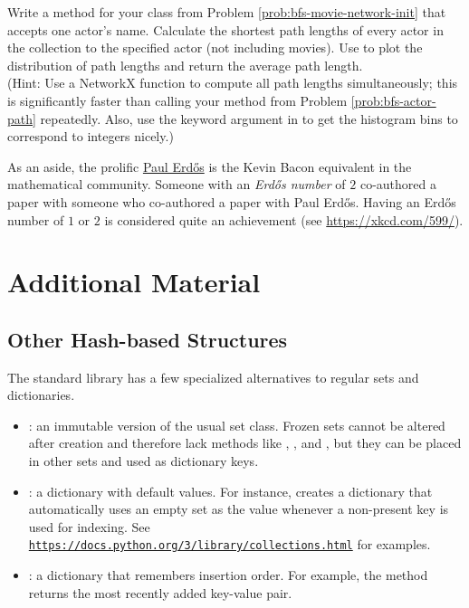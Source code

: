 \begin{problem} %
\label{prob:bfs-average-bacon-number}
Write a method for your class from Problem \ref{prob:bfs-movie-network-init} that accepts one actor's name.
Calculate the shortest path lengths of every actor in the collection to the specified actor (not including movies).
Use  to plot the distribution of path lengths and return the average path length.
\\(Hint: Use a NetworkX function to compute all path lengths simultaneously; this is significantly faster than calling your method from Problem \ref{prob:bfs-actor-path} repeatedly.
Also, use the keyword argument  in  to get the histogram bins to correspond to integers nicely.)
\end{problem}

As an aside, the prolific \href{https://en.wikipedia.org/wiki/Erd%C5%91s_number}{Paul Erd\H{o}s} is the Kevin Bacon equivalent in the mathematical community.
Someone with an \emph{Erd\H{o}s number} of $2$ co-authored a paper with someone who co-authored a paper with Paul Erd\H{o}s.
Having an Erd\H{o}s number of $1$ or $2$ is considered quite an achievement (see \url{https://xkcd.com/599/}).

\newpage

\section*{Additional Material} %

\subsection*{Other Hash-based Structures} %

The standard library has a few specialized alternatives to regular sets and dictionaries.
\begin{itemize}
\item {}: an immutable version of the usual set class.
Frozen sets cannot be altered after creation and therefore lack methods like , , and , but they can be placed in other sets and used as dictionary keys.

\item {}: a dictionary with default values.
For instance,  creates a dictionary that automatically uses an empty set as the value whenever a non-present key is used for indexing.
See \href{https://docs.python.org/3/library/collections.html\#defaultdict-examples}{\texttt{https://docs.python.org/3/library/collections.html}} for examples.

\item {}: a dictionary that remembers insertion order.
For example, the  method returns the most recently added key-value pair.
\end{itemize}

